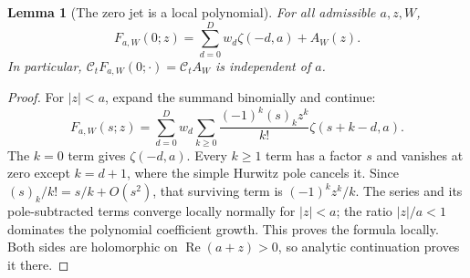 \documentclass[11pt]{article}
\numberwithin{equation}{section}
\newtheorem{lemma}[theorem]{Lemma}
\theoremstyle{definition}\newtheorem{definition}[theorem]{Definition}
\theoremstyle{remark}\newtheorem{remark}[theorem]{Remark}
\DeclareMathOperator{\Rea}{Re}
\newcommand{\CC}{\mathcal C}
\begin{document}
\begin{lemma}[The zero jet is a local polynomial]\label{hsd:lem:zero}
For all admissible $a,z,W$,
\begin{equation}\label{hsd:eq:Fzero}
 F_{a,W}(0;z)=\sum_{d=0}^D w_d\zeta(-d,a)+A_W(z).
\end{equation}
In particular, $\CC_tF_{a,W}(0;\cdot)=\CC_t A_W$ is independent of $a$.
\end{lemma}
\begin{proof}
For $|z|<a$, expand the summand binomially and continue:
\begin{equation}\label{hsd:eq:Fbinomial}
 F_{a,W}(s;z)=\sum_{d=0}^D w_d\sum_{k\ge0}
 \frac{(-1)^k(s)_kz^k}{k!}\zeta(s+k-d,a).
\end{equation}
The $k=0$ term gives $\zeta(-d,a)$. Every $k\ge1$ term has a factor
$s$ and vanishes at zero except $k=d+1$, where the simple Hurwitz pole
cancels it. Since $(s)_k/k!=s/k+O(s^2)$, that surviving term is
$(-1)^kz^k/k$. The series and its pole-subtracted terms converge locally
normally for $|z|<a$; the ratio $|z|/a<1$ dominates the polynomial
coefficient growth. This proves the formula locally. Both sides are
holomorphic on $\Rea(a+z)>0$, so analytic continuation proves it there.
\end{proof}
\end{document}
